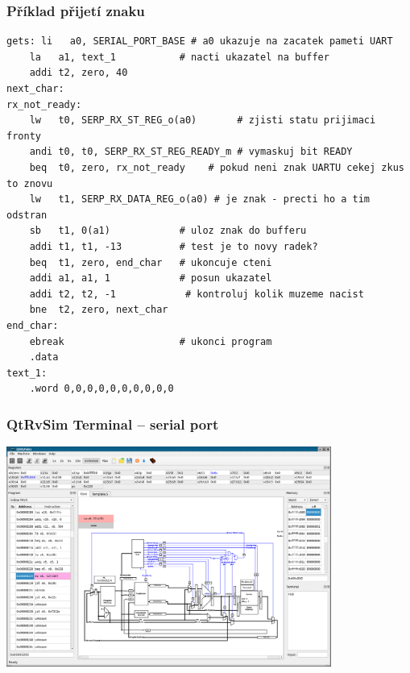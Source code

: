 \documentclass{beamer}
\begin{document}
\begin{frame}[fragile]
\frametitle{Příklad přijetí znaku}

\begin{verbatim}
gets: li   a0, SERIAL_PORT_BASE # a0 ukazuje na zacatek pameti UART
    la   a1, text_1           # nacti ukazatel na buffer
    addi t2, zero, 40
next_char:
rx_not_ready:
    lw   t0, SERP_RX_ST_REG_o(a0)       # zjisti statu prijimaci fronty
    andi t0, t0, SERP_RX_ST_REG_READY_m # vymaskuj bit READY
    beq  t0, zero, rx_not_ready    # pokud neni znak UARTU cekej zkus to znovu
    lw   t1, SERP_RX_DATA_REG_o(a0) # je znak - precti ho a tim odstran
    sb   t1, 0(a1)            # uloz znak do bufferu
    addi t1, t1, -13          # test je to novy radek?
    beq  t1, zero, end_char   # ukoncuje cteni
    addi a1, a1, 1            # posun ukazatel
    addi t2, t2, -1            # kontroluj kolik muzeme nacist
    bne  t2, zero, next_char
end_char:
    ebreak                    # ukonci program
    .data
text_1:
    .word 0,0,0,0,0,0,0,0,0,0
\end{verbatim}
\end{frame}



\begin{frame}
\frametitle{QtRvSim Terminal -- serial port}
\begin{center}
\includegraphics[width=0.8\textwidth]{fig/QtRvSim-serial-normal.png}
\end{center}
\end{frame}
\end{document}
